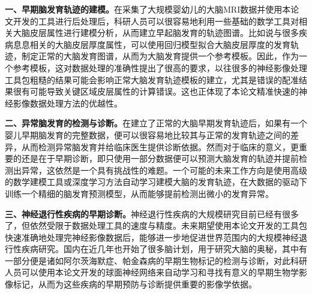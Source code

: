 \textbf{一、早期脑发育轨迹的建模。}在采集了大规模婴幼儿的大脑MRI数据并使用本论文开发的工具进行后处理后，科研人员可以很容易地利用一些基础的数学工具对相关大脑皮层属性进行建模分析，从而建立早起脑发育的轨迹图谱。比如说与很多疾病息息相关的大脑皮层厚度属性，可以使用回归模型拟合大脑皮层厚度的发育轨迹，制定正常的大脑发育图谱，从而为大脑发育提供一个参考模板。因此，作为一个参考模板，这对数据处理的准确性提出了很高的要求，以往很多的神经影像处理工具包粗糙的结果可能会影响正常大脑发育轨迹模板的建立，尤其是错误的配准结果很有可能导致关键区域皮层属性的计算错误。这也正体现了本论文精准快速的神经影像数据处理方法的优越性。

\textbf{二、异常脑发育的检测与诊断。}在建立了正常的大脑早期发育轨迹后，如果有一个婴儿早期脑发育的完整数据，便可以很容易地比较其与正常的发育轨迹之间的差异，从而检测异常脑发育并给临床医生提供诊断依据。然而对于临床的意义，更重要的还是在于早期诊断，即只使用一部分数据便可以预测大脑发育的轨迹并提前检测出异常，这依然是一个具有挑战性的难题。一个可能的未来工作方向是使用高级的数学建模工具或深度学习方法自动学习建模大脑的发育轨迹，在大数据的驱动下训练一个精细的脑发育预测模型，从而能够提前检测出微小的发育异常。

\textbf{三、神经退行性疾病的早期诊断。}神经退行性疾病的大规模研究目前已经有很多了，但依然受限于数据处理工具的速度与精度。未来期望使用本论文开发的工具包快速准确地处理完神经影像数据后，能够进一步地促进世界范围内的大规模神经退行性疾病研究。国内在近几年也开始了很多脑计划，用于研究大脑的奥秘，其中有一部分便是诸如阿尔茨海默症、帕金森病的早期生物标记的检测与诊断，对此科研人员可以使用本论文开发的球面神经网络来自动学习和寻找有意义的早期生物学影像标记，从而为这些疾病的早期预防与诊断提供重要的影像学依据。